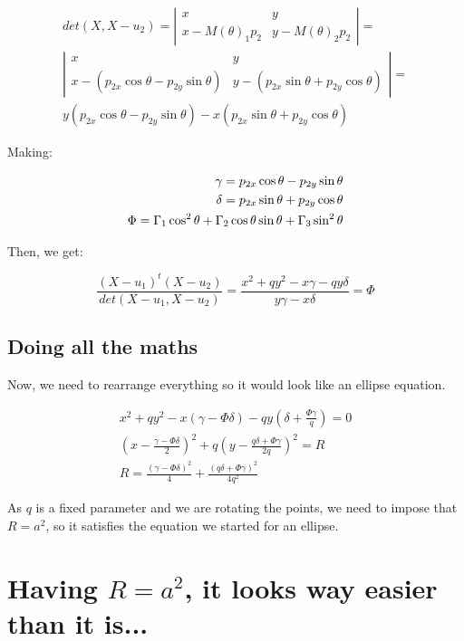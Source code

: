 \documentclass{article}
\begin{document}
\begin{align*}
det(X,X-u_2)=\left|
\begin{array}{cc}
x & y\\
x - M(\theta)_1p_2 & y - M(\theta)_2p_2 
\end{array}
\right| =\\
\left|
\begin{array}{cc}
	x & y\\
	x -(p_{2x}\cos{\theta} - p_{2y}\sin{\theta}) & y - (p_{2x}\sin{\theta} + p_{2y}\cos{\theta}) 
\end{array}
\right|=\\
y(p_{2x}\cos{\theta} - p_{2y}\sin{\theta}) - x(p_{2x}\sin{\theta} + p_{2y}\cos{\theta})
\end{align*}

Making:

\begin{eqnarray}
\gamma = p_{2x}\cos{\theta} - p_{2y}\sin{\theta}\\
\delta = p_{2x}\sin{\theta} + p_{2y}\cos{\theta}\\
\Phi = \Gamma_1\cos^2{\theta} + \Gamma_2\cos{\theta}\sin{\theta} + \Gamma_3\sin^2{\theta}
\end{eqnarray}

Then, we get:

\begin{equation}
\dfrac{(X-u_1)^t(X-u_2)}{det(X-u_1, X-u_2)} = \dfrac{x^2 + qy^2 - x\gamma -qy\delta}{y\gamma - x\delta} = \Phi
\end{equation}

\subsection{Doing all the maths}

Now, we need to rearrange everything so it would look like an ellipse equation.

\begin{eqnarray*}
x^2 + qy^2 - x(\gamma -\Phi\delta) - qy(\delta + \frac{\Phi\gamma}{q}) = 0\\
(x - \frac{\gamma -\Phi\delta}{2})^2 + q(y - \frac{q\delta + \Phi\gamma}{2q})^2 = R\\
R= \frac{(\gamma - \Phi\delta)^2}{4} + \frac{(q\delta + \Phi\gamma)^2}{4q^2}
\end{eqnarray*}

As $q$ is a fixed parameter and we are rotating the points, we need to impose that $R=a^2$, so it satisfies the equation we started for an ellipse.

\section{Having $R=a^2$, it looks way easier than it is...}
\end{document}
